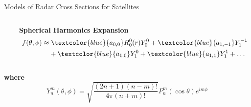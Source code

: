 % 

\begin{frame}{Models of Radar Cross Sections for Satellites}
    \centering
    \begin{columns}[c,onlytextwidth]
        \begin{column}{0.4\textwidth}
            \centering
        \end{column}

        \begin{column}{0.6\textwidth}
            \centering
            \textbf{\large Spherical Harmonics Expansion} \\[0.8em]
            \begin{align*}
                f(\theta, \phi) \approx & \; \textcolor{blue}{a_{0,0}} R_{0}^{0}(r)Y_0^0 
                + \textcolor{blue}{a_{1,-1}} Y_1^{-1} \\
                & + \textcolor{blue}{a_{1,0}} Y_1^0 
                + \textcolor{blue}{a_{1,1}} Y_1^1 
                + \dots
            \end{align*}
        \end{column}
    \end{columns}

    \vspace{1em}
    \textbf{where}
    \[
    Y_n^m(\theta, \phi) = 
    \sqrt{\frac{(2n + 1)(n - m)!}{4\pi (n + m)!}} P_n^m(\cos \theta) e^{im\phi}
    \]
\end{frame}

\endinput  %
